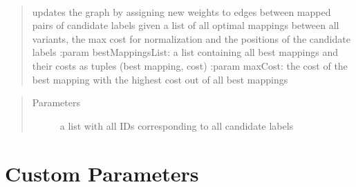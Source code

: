 \documentclass[letterpaper,10pt,english]{sphinxmanual}
\begin{document}
\begin{fulllineitems}
\begin{fulllineitems}
\label{\detokenize{graph:graph.graphTool.graphTool.addOptimalMappings}}~\begin{quote}

updates the graph by assigning new weights to edges between mapped pairs of candidate labels given a list of all optimal mappings between all variants, the max cost for normalization and the positions of the candidate labels
:param bestMappingsList: a list containing all best mappings and their costs as tuples (best mapping, cost)
:param maxCost: the cost of the best mapping with the highest cost out of all best mappings
\end{quote}
\begin{quote}\begin{description}
\item[{Parameters}] \leavevmode
{} \textendash{} a list with all IDs corresponding to all candidate labels

\end{description}\end{quote}

\end{fulllineitems}


\end{fulllineitems}


\begin{DUlineblock}{0em}
\item[] 
\end{DUlineblock}

{\hyperref[\detokenize{index:mastertoc}]{}}


\chapter{Custom Parameters}
\label{\detokenize{customParameters:custom-parameters}}\label{\detokenize{customParameters::doc}}
\begin{DUlineblock}{0em}
\item[] 
\end{DUlineblock}
\end{document}
